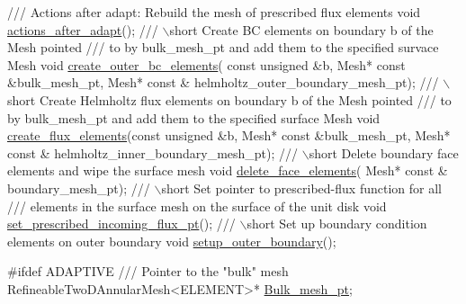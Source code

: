\begin{DoxyCodeInclude}
 \textcolor{comment}{}
\textcolor{comment}{ /// Actions after adapt: Rebuild the mesh of prescribed flux elements}
\textcolor{comment}{} \textcolor{keywordtype}{void} \hyperlink{classScatteringProblem_a13d8f85e74666c260de7364917359ed5}{actions\_after\_adapt}();
 \textcolor{comment}{}
\textcolor{comment}{ /// \(\backslash\)short Create BC elements on boundary b of the Mesh pointed}
\textcolor{comment}{ /// to by bulk\_mesh\_pt and add them to the specified survace Mesh }
\textcolor{comment}{} \textcolor{keywordtype}{void} \hyperlink{classScatteringProblem_a408e05fbe1f1456ab7013a7e8ab29ccc}{create\_outer\_bc\_elements}(
  \textcolor{keyword}{const} \textcolor{keywordtype}{unsigned} &b, Mesh* \textcolor{keyword}{const} &bulk\_mesh\_pt,
  Mesh* \textcolor{keyword}{const} & helmholtz\_outer\_boundary\_mesh\_pt);
 \textcolor{comment}{}
\textcolor{comment}{ /// \(\backslash\)short Create Helmholtz flux elements on boundary b of the Mesh pointed}
\textcolor{comment}{ /// to by bulk\_mesh\_pt and add them to the specified surface Mesh }
\textcolor{comment}{} \textcolor{keywordtype}{void} \hyperlink{classScatteringProblem_af06ff518ad3250f914c0c659af3001c8}{create\_flux\_elements}(\textcolor{keyword}{const} \textcolor{keywordtype}{unsigned} &b, Mesh* \textcolor{keyword}{const} &bulk\_mesh\_pt,
                           Mesh* \textcolor{keyword}{const} & helmholtz\_inner\_boundary\_mesh\_pt);
 \textcolor{comment}{}
\textcolor{comment}{ /// \(\backslash\)short Delete boundary face elements and wipe the surface mesh}
\textcolor{comment}{} \textcolor{keywordtype}{void} \hyperlink{classScatteringProblem_aaef8a78e317333ddadd0be6a500c1134}{delete\_face\_elements}( Mesh* \textcolor{keyword}{const} & boundary\_mesh\_pt);
 \textcolor{comment}{}
\textcolor{comment}{ /// \(\backslash\)short Set pointer to prescribed-flux function for all}
\textcolor{comment}{ /// elements in the surface mesh on the surface of the unit disk}
\textcolor{comment}{} \textcolor{keywordtype}{void} \hyperlink{classScatteringProblem_ae75307dde909513a0f11057c96cdd622}{set\_prescribed\_incoming\_flux\_pt}();
\textcolor{comment}{}
\textcolor{comment}{ /// \(\backslash\)short Set up boundary condition elements on outer boundary}
\textcolor{comment}{} \textcolor{keywordtype}{void} \hyperlink{classScatteringProblem_a76bd8299ea7ed559681b294acfb2aad4}{setup\_outer\_boundary}();

\textcolor{preprocessor}{#ifdef ADAPTIVE}
\textcolor{comment}{}
\textcolor{comment}{/// Pointer to the "bulk" mesh}
\textcolor{comment}{} RefineableTwoDAnnularMesh<ELEMENT>* \hyperlink{classScatteringProblem_a8c61657a1d09ce49a5871ca3febe5658}{Bulk\_mesh\_pt};


\end{DoxyCodeInclude}
